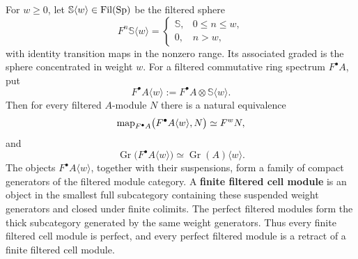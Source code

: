 \begin{construction}
\label{con:free-filtered-weight-generators}
For \(w\geq0\), let \(\mathbb S\langle w\rangle\in\operatorname{Fil}(\operatorname{Sp})\)
be the filtered sphere
\[
    F^n\mathbb S\langle w\rangle
    =
    \begin{cases}
        \mathbb S,&0\leq n\leq w,\\
        0,&n>w,
    \end{cases}
\]
with identity transition maps in the nonzero range. Its associated graded is
the sphere concentrated in weight \(w\). For a filtered commutative ring
spectrum \(F^\bullet A\), put
\[
    F^\bullet A\langle w\rangle
    :=
    F^\bullet A\otimes\mathbb S\langle w\rangle.
\]
Then for every filtered \(A\)-module \(N\) there is a natural equivalence
\[
    \operatorname{map}_{F^\bullet A}
    \bigl(F^\bullet A\langle w\rangle,N\bigr)
    \simeq
    F^wN,
\]
and
\[
    \operatorname{Gr}
    \bigl(F^\bullet A\langle w\rangle\bigr)
    \simeq
    \operatorname{Gr}(A)\langle w\rangle.
\]
The objects \(F^\bullet A\langle w\rangle\), together with their suspensions,
form a family of compact generators of the filtered module category. A
\textbf{finite filtered cell module} is an object in the smallest full subcategory
containing these suspended weight generators and closed under finite colimits.
The perfect filtered modules form the thick subcategory generated by the same
weight generators. Thus every finite filtered cell module is perfect, and every
perfect filtered module is a retract of a finite filtered cell module.
\end{construction}

